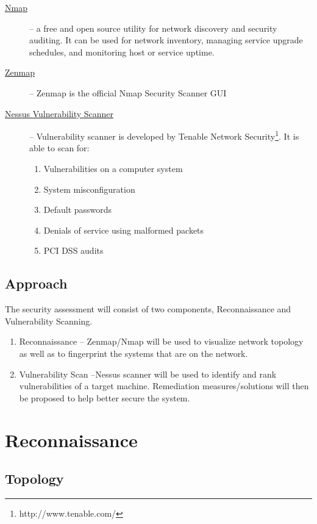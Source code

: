 \documentclass{article}[12 pt,a4paper]
\begin{document}
\begin{description}
\item[\href{https://nmap.org/}{Nmap}] -- a free and open source utility for network discovery and security auditing. It can be used for network inventory, managing service upgrade schedules, and monitoring host or service uptime.
\item[\href{https://nmap.org/zenmap/}{Zenmap}] -- Zenmap is the official Nmap Security Scanner GUI
\item[\href{https://www.tenable.com/products/nessus-vulnerability-scanner}{Nessus Vulnerability Scanner}] --  Vulnerability scanner is developed by Tenable Network Security\footnote{http://www.tenable.com/}. It is able to scan for:
\begin{enumerate}
\item Vulnerabilities on a computer system
\item System misconfiguration
\item Default passwords
\item Denials of service using malformed packets
\item PCI DSS audits
\end{enumerate}
\end{description}

\subsection{Approach}

The security assessment will consist of two components, Reconnaissance and Vulnerability Scanning. 
\begin{enumerate}
\item Reconnaissance -- Zenmap/Nmap will be used to visualize network topology as well as to fingerprint the systems that are on the network. 
\item Vulnerability Scan --Nessus scanner will be used to identify and rank vulnerabilities of a target machine. Remediation measures/solutions will then be proposed to help better secure the system.
\end{enumerate}

\section{Reconnaissance}

\subsection{Topology}
\end{document}
